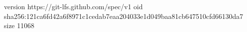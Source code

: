 version https://git-lfs.github.com/spec/v1
oid sha256:121ca6fd42a6f8971c1cedab7eaa204033e1d049baa81cb647510cfd66130da7
size 11068
